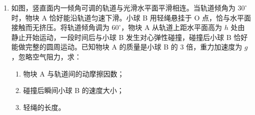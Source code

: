 \documentclass[\gkver]{gaokaozhenti}
\begin{document}
\begin{enumerate}
{	（2）设玻璃管横截面积为 $S$，玻璃管水平时封闭气体压强

	$p_{1} = 76 \UcmHg$

	体积 $V_{1} = l_{1}S$

	玻璃管竖起来后压强为

	$p_{2} = 19 \UcmHg + 76 \UcmHg = 95 \UcmHg$

	体积 $V_{2} = l_{2}S$

	封闭气体发生等温变化，由玻意耳定律得

	$p_{1}V_{1} = p_{2}V_{2}$，解得 $l_{2} = 20 \Ucm$。

	（3）保持玻璃管竖直向上，升温过程中气体发生等压变化，由盖-吕萨克定律得

	$\frac{V_{2}}{T_{1}} = \frac{V_{3}}{T_{2}}$

	其中 $T_{1} = 300 \UK$，$T_{2} = 360 \UK$，$V_{2} = l_{2}S$，$V_{3} = l_{3}S$

	解得 $l_{3} = 24 \Ucm$。
}

\item
如图，竖直面内一倾角可调的轨道与光滑水平面平滑相连。当轨道倾角为 $30^\circ$ 时，物块 A 恰好能沿轨道匀速下滑。小球 B 用轻绳悬挂于 O 点，恰与水平面接触而无挤压。将轨道倾角调为 $60^\circ$，物块 A 从轨道上距水平面高为 $h$ 处由静止开始运动，一段时间后与小球 B 发生对心弹性碰撞，碰撞后小球 B 恰好能做完整的圆周运动。已知物块 A 的质量是小球 B 的 3 倍，重力加速度为 $g$，忽略空气阻力，求：

\begin{enumerate}
	\item
	物块 A 与轨道间的动摩擦因数；
	\item
	碰撞后瞬间小球 B 的速度大小；
	\item
	轻绳的长度。
\end{enumerate}


\end{enumerate}
\end{document}
